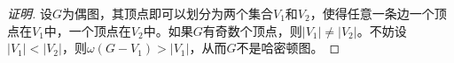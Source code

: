 \begin{proof}[证明]
  设$G$为偶图，其顶点即可以划分为两个集合$V_1$和$V_2$，使得任意一条边一个顶点在$V_1$中，一个顶点在$V_2$中。如果$G$有奇数个顶点，则$|V_1|\neq |V_2|$。不妨设$|V_1| < |V_2|$，则$\omega (G-V_1) > |V_1|$，从而$G$不是哈密顿图。
\end{proof}
